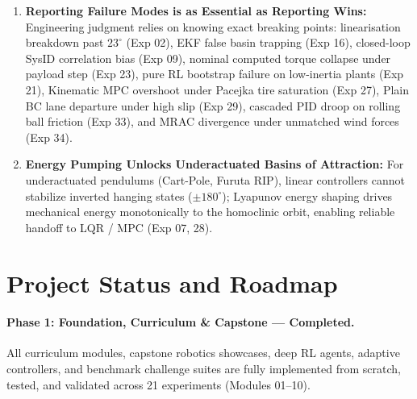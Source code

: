\documentclass[11pt,a4paper]{article}
\begin{document}
\begin{enumerate}
  \item \textbf{Reporting Failure Modes is as Essential as Reporting Wins:} Engineering judgment relies on knowing exact breaking points: linearisation breakdown past $23^\circ$ (Exp 02), EKF false basin trapping (Exp 16), closed-loop SysID correlation bias (Exp 09), nominal computed torque collapse under payload step (Exp 23), pure RL bootstrap failure on low-inertia plants (Exp 21), Kinematic MPC overshoot under Pacejka tire saturation (Exp 27), Plain BC lane departure under high slip (Exp 29), cascaded PID droop on rolling ball friction (Exp 33), and MRAC divergence under unmatched wind forces (Exp 34).
  \item \textbf{Energy Pumping Unlocks Underactuated Basins of Attraction:} For underactuated pendulums (Cart-Pole, Furuta RIP), linear controllers cannot stabilize inverted hanging states ($\pm 180^\circ$); Lyapunov energy shaping drives mechanical energy monotonically to the homoclinic orbit, enabling reliable handoff to LQR / MPC (Exp 07, 28).
\end{enumerate}

\section{Project Status and Roadmap}

\paragraph{Phase 1: Foundation, Curriculum \& Capstone --- Completed.}
All curriculum modules, capstone robotics showcases, deep RL agents, adaptive controllers, and benchmark challenge suites are fully implemented from scratch, tested, and validated across 21 experiments (Modules 01--10).
\end{document}
